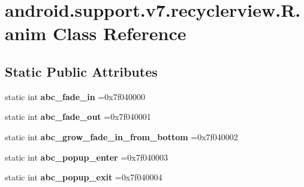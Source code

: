 \hypertarget{classandroid_1_1support_1_1v7_1_1recyclerview_1_1R_1_1anim}{}\section{android.\+support.\+v7.\+recyclerview.\+R.\+anim Class Reference}
\label{classandroid_1_1support_1_1v7_1_1recyclerview_1_1R_1_1anim}
\subsection*{Static Public Attributes}
\begin{DoxyCompactItemize}
\item 
\mbox{\label{classandroid_1_1support_1_1v7_1_1recyclerview_1_1R_1_1anim_a588bf05828de4be35c5bb444e49cd6a2}} 
static int {\bfseries abc\+\_\+fade\+\_\+in} =0x7f040000
\item 
\mbox{\label{classandroid_1_1support_1_1v7_1_1recyclerview_1_1R_1_1anim_acdb2343a7d7115d9c9e59d7639a13ac1}} 
static int {\bfseries abc\+\_\+fade\+\_\+out} =0x7f040001
\item 
\mbox{\label{classandroid_1_1support_1_1v7_1_1recyclerview_1_1R_1_1anim_a4d8869122f2e1777c6da9bbe9d5c4ff3}} 
static int {\bfseries abc\+\_\+grow\+\_\+fade\+\_\+in\+\_\+from\+\_\+bottom} =0x7f040002
\item 
\mbox{\label{classandroid_1_1support_1_1v7_1_1recyclerview_1_1R_1_1anim_a01fca78c8e36ca9202853a9630388749}} 
static int {\bfseries abc\+\_\+popup\+\_\+enter} =0x7f040003
\item 
\mbox{\label{classandroid_1_1support_1_1v7_1_1recyclerview_1_1R_1_1anim_ac05e1e24a82c42770285861729a8fa93}} 
static int {\bfseries abc\+\_\+popup\+\_\+exit} =0x7f040004
\item 
\mbox{\label{classandroid_1_1support_1_1v7_1_1recyclerview_1_1R_1_1anim_a4702ce485ba1edcbfe3053d527411284}} 

\end{DoxyCompactItemize}
